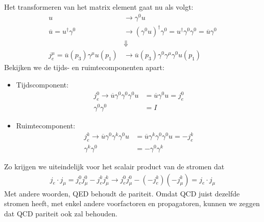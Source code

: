 \documentclass[../main.tex]{subfiles}
\begin{document}
Het transformeren van het matrix element gaat nu als volgt:
\begin{equation}
    \begin{aligned}
        \label{eq:qed_mat_par}
        u &\rightarrow \gamma^0 u\\
        \overline u = u^\dagger \gamma^0 &\rightarrow (\gamma^0u)^\dagger \gamma^0=u^\dagger\gamma^0\gamma^0 = \overline u \gamma^0\\
                                         &\Downarrow\\
        j_e^\mu = \overline u(p_3)\gamma^\mu u(p_1) &\rightarrow \overline u(p_3)\gamma^0\gamma^\mu\gamma^0 u(p_1)
    \end{aligned}
\end{equation}
Bekijken we de tijds- en ruimtecomponenten apart:
\begin{itemize}
    \item Tijdscomponent:
        \begin{equation}
            \begin{aligned}
                \label{eq:qed_mat_par_tijd}
                j_e^0 \rightarrow \overline u\gamma^0\gamma^0\gamma^0 u &= \overline u \gamma^0 u = j_e^0\\
                \gamma^0\gamma^0&=I
            \end{aligned}
        \end{equation}
    \item Ruimtecomponent:
        \begin{equation}
            \begin{aligned}
                \label{eq:qed_mat_par_ruimte}
                j_e^k \rightarrow \overline u\gamma^0\gamma^k\gamma^0 u &= \overline u\gamma^k\gamma^0\gamma^0 u = -j_e^k\\
                \gamma^k\gamma^0&=-\gamma^0\gamma^k
            \end{aligned}
        \end{equation}
\end{itemize}
Zo krijgen we uiteindelijk voor het scalair product van de stromen dat
\begin{equation}
    \begin{aligned}
        \label{eq:qed_stromen_par}
        j_e\cdot j_\mu = j_e^0j_\mu^0 - j_e^kj_\mu^k \rightarrow j_e^0j_\mu^0 - (-j_e^k)(-j_\mu^k) = j_e\cdot j_\mu
    \end{aligned}
\end{equation}
Met andere woorden, QED behoudt de pariteit. Omdat QCD juist dezelfde stromen heeft, met enkel andere voorfactoren en propagatoren, kunnen we zeggen dat QCD pariteit ook zal behouden.
\end{document}
